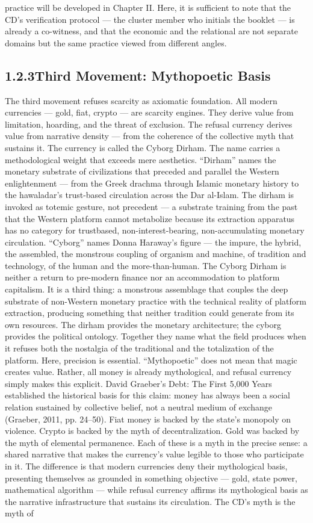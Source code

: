 practice will be developed in Chapter II. Here, it is sufficient to note that the CD’s verification protocol — the cluster member who initials the booklet — is already a co-witness, and that the economic and the relational are not separate domains but the same practice viewed from different angles.

\subsection{1.2.3\quad Third Movement: Mythopoetic Basis}

The third movement refuses scarcity as axiomatic foundation. All modern currencies — gold, fiat, crypto — are scarcity engines. They derive value from limitation, hoarding, and the threat of exclusion. The refusal currency derives value from narrative density — from the coherence of the collective myth that sustains it. The currency is called the Cyborg Dirham. The name carries a methodological weight that exceeds mere aesthetics. “Dirham” names the monetary substrate of civilizations that preceded and parallel the Western enlightenment — from the Greek drachma through Islamic monetary history to the hawaladar’s trust-based circulation across the Dar al-Islam. The dirham is invoked as totemic gesture, not precedent — a substrate training from the past that the Western platform cannot metabolize because its extraction apparatus has no category for trustbased, non-interest-bearing, non-accumulating monetary circulation. “Cyborg” names Donna Haraway’s figure — the impure, the hybrid, the assembled, the monstrous coupling of organism and machine, of tradition and technology, of the human and the more-than-human. The Cyborg Dirham is neither a return to pre-modern finance nor an accommodation to platform capitalism. It is a third thing: a monstrous assemblage that couples the deep substrate of non-Western monetary practice with the technical reality of platform extraction, producing something that neither tradition could generate from its own resources. The dirham provides the monetary architecture; the cyborg provides the political ontology. Together they name what the field produces when it refuses both the nostalgia of the traditional and the totalization of the platform. Here, precision is essential. “Mythopoetic” does not mean that magic creates value. Rather, all money is already mythological, and refusal currency simply makes this explicit. David Graeber’s Debt: The First 5,000 Years established the historical basis for this claim: money has always been a social relation sustained by collective belief, not a neutral medium of exchange (Graeber, 2011, pp. 24–50). Fiat money is backed by the state’s monopoly on violence. Crypto is backed by the myth of decentralization. Gold was backed by the myth of elemental permanence. Each of these is a myth in the precise sense: a shared narrative that makes the currency’s value legible to those who participate in it. The difference is that modern currencies deny their mythological basis, presenting themselves as grounded in something objective — gold, state power, mathematical algorithm — while refusal currency affirms its mythological basis as the narrative infrastructure that sustains its circulation. The CD’s myth is the myth of 